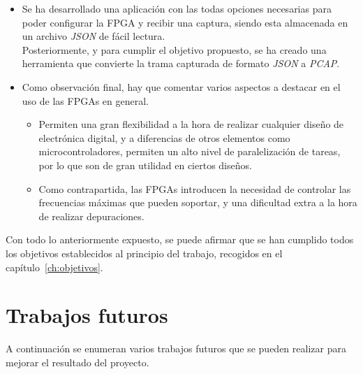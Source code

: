 \begin{itemize}
    \item Se ha desarrollado una aplicación con las todas opciones necesarias para poder configurar la FPGA y recibir una captura, siendo esta almacenada en un archivo \emph{JSON} de fácil lectura. \\
    Posteriormente, y para cumplir el objetivo propuesto, se ha creado una herramienta que convierte la trama capturada de formato \emph{JSON} a \emph{PCAP}.
    
    \item Como observación final, hay que comentar varios aspectos a destacar en el uso de las FPGAs en general.
    \begin{itemize}
        \item Permiten una gran flexibilidad a la hora de realizar cualquier diseño de electrónica digital, y a diferencias de otros elementos como microcontroladores, permiten un alto nivel de paralelización de tareas, por lo que son de gran utilidad en ciertos diseños.
        
        \item Como contrapartida, las FPGAs introducen la necesidad de controlar las frecuencias máximas que pueden soportar, y una dificultad extra a la hora de realizar depuraciones.
    \end{itemize}
\end{itemize}

Con todo lo anteriormente expuesto, se puede afirmar que se han cumplido todos los objetivos establecidos al principio del trabajo, recogidos en el capítulo~\ref{ch:objetivos}.



\section{Trabajos futuros}
A continuación se enumeran varios trabajos futuros que se pueden realizar para mejorar el resultado del proyecto.

